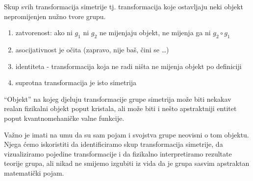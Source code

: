\begin{primjer}
Skup svih transformacija simetrije tj. transformacija koje ostavljaju
neki objekt nepromijenjen nužno tvore grupu.

\begin{enumerate}[1)]
\item zatvorenost: ako ni $g_1$ ni $g_2$ ne mijenjaju objekt, ne mijenja
   ga ni $g_2 \circ g_1$

\item asocijativnost je očita (zapravo, nije baš, čini se \dots)

\item identiteta - transformacija koja ne radi ništa ne mijenja objekt
   po definiciji

\item suprotna transformacija je isto simetrija
\end{enumerate}

``Objekt'' na kojeg djeluju transformacije grupe simetrija može biti
nekakav realan fizikalni objekt poput kristala, ali može biti i
nešto apstraktniji entitet poput kvantnomehaničke valne funkcije.

Važno je imati na umu da su sam pojam i svojstva grupe neovisni o
tom objektu. Njega ćemo iskoristiti da identificiramo skup transformacija
simetrije, da vizualiziramo pojedine transformacije i da
fizikalno interpretiramo rezultate teorije grupa, ali nikad
ne smijemo izgubiti iz vida da je grupa sasvim apstraktan matematički pojam.

\end{primjer}


